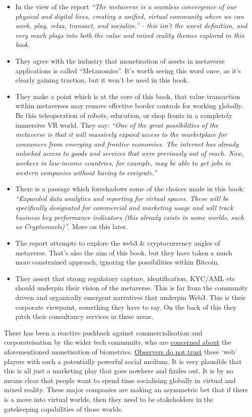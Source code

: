 \begin{itemize}
\item In the view of the report \textit{``The metaverse is a seamless convergence of our physical and digital lives, creating a unified, virtual community where we can work, play, relax, transact, and socialize.'' - this isn't the worst definition, and very much plays into both the value and mixed reality themes explored in this book.}
\item They agree with the industry that monetisation of assets in metaverse applications is called ``Metanomics''. It's worth seeing this word once, as it's clearly gaining traction, but it won't be used in this book.
\item They make a point which is at the core of this book, that value transaction within metaverses may remove effective border controls for working globally. Be this teleoperation of robots, education, or shop fronts in a completely immersive VR world. They say: \textit{``One of the great possibilities of the metaverse is that it will massively expand access to the marketplace for consumers from emerging and frontier economies. The internet has already unlocked access to goods and services that were previously out of reach. Now, workers in low-income countries, for example, may be able to get jobs in western companies without having to emigrate.''}
\item There is a passage which foreshadows some of the choices made in this book: \textit{``Expanded data analytics and reporting for virtual spaces. These will be specifically designated for commercial and marketing usage and will track business key performance indicators (this
already exists in some worlds, such as Cryptovoxels)''}. More on this later.
\item The report attempts to explore the web3 \& cryptocurrency angles of metaverse. That's also the aim of this book, but they have taken a much more constrained approach, ignoring the possibilities within Bitcoin.
\item They assert that strong regulatory capture, identification, KYC/AML etc should underpin their vision of the metaverse. This is far from the community driven and organically emergent narratives that underpin Web3. This is their corporate viewpoint, something they have to say. On the back of this they pitch their consultancy services in these areas.
\end{itemize}
There has been a reactive pushback against commercialisation and corporateisation by the wider tech community, who are \href{https://www.metaversethics.org/p/mde02-metaverse-data-privacy-1}{concerned about} the aforementioned monetisation of biometrics. \href{https://www.coindesk.com/layer2/2022/01/19/meta-leans-in-to-tracking-your-emotions-in-the-metaverse/}{Observers do not trust} these `web' players with such a potentially powerful social medium. It is very plausible that this is all just a marketing play that goes nowhere and fizzles out. It is by no means clear that people want to spend time socialising globally in virtual and mixed reality. These major companies are  making an asymmetric bet that if there is a move into virtual worlds, then they need to be stakeholders in the gatekeeping capabilities of those worlds.\par

